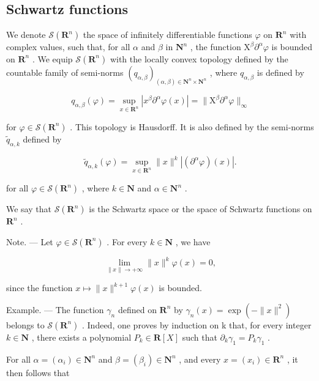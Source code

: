 \subsection{Schwartz functions}

We denote \(\mathcal{S}(\mathbf{R}^{n})\) the space of infinitely differentiable functions \(\varphi\) on \(\mathbf{R}^{n}\) with complex values, such that, for all \(\alpha\) and \(\beta\) in \(\mathbf{N}^{n}\) , the function \(\mathrm{X}^{\beta}\partial^{\alpha}\varphi\) is bounded on \(\mathbf{R}^{n}\) . We equip \(\mathcal{S}(\mathbf{R}^{n})\) with the locally convex topology defined by the countable family of semi-norms \((q_{\alpha,\beta})_{(\alpha,\beta)\in\mathbf{N}^{n}\times\mathbf{N}^{n}}\) , where \(q_{\alpha,\beta}\) is defined by

\[
q _ {\alpha , \beta} (\varphi) = \sup _ {x \in \mathbf {R} ^ {n}} | x ^ {\beta} \partial^ {\alpha} \varphi (x) | = \| \mathrm{X} ^ {\beta} \partial^ {\alpha} \varphi \| _ {\infty}
\]

for \(\varphi\in\mathcal{S}(\mathbf{R}^{n})\) . This topology is Hausdorff. It is also defined by the semi-norms \(\widetilde{q}_{\alpha,k}\) defined by

\[
\widetilde {q} _ {\alpha , k} (\varphi) = \sup _ {x \in \mathbf {R} ^ {n}} \| x \| ^ {k} | (\partial^ {\alpha} \varphi) (x) |.
\]

for all \(\varphi\in\mathcal{S}(\mathbf{R}^{n})\) , where \(k\in\mathbf{N}\) and \(\alpha\in\mathbf{N}^{n}\) .

We say that \(\mathcal{S}(\mathbf{R}^{n})\) is the Schwartz space or the space of Schwartz functions on \(\mathbf{R}^{n}\) .

Note. --- Let \(\varphi\in\mathcal{S}(\mathbf{R}^{n})\) . For every \(k\in\mathbf{N}\) , we have

\[
\lim _ {\| x \| \to + \infty} \| x \| ^ {k} \varphi (x) = 0,
\]

since the function \(x \mapsto \|x\|^{k+1} \varphi(x)\) is bounded.

Example. --- The function \(\gamma_{n}\) defined on \(\mathbf{R}^{n}\) by \(\gamma_{n}(x)=\exp(-\|x\|^{2})\) belongs to \(\mathcal{S}(\mathbf{R}^{n})\) . Indeed, one proves by induction on k that, for every integer \(k\in \mathbf{N}\) , there exists a polynomial \(P_{k}\in\mathbf{R}[X]\) such that \(\partial_{k}\gamma_{1}=P_{k}\gamma_{1}\) .

For all \(\alpha = (\alpha_{i})\in \mathbf{N}^{n}\) and \(\beta = (\beta_{i})\in \mathbf{N}^{n}\) , and every \(x = (x_{i})\in \mathbf{R}^{n}\) , it then follows that

